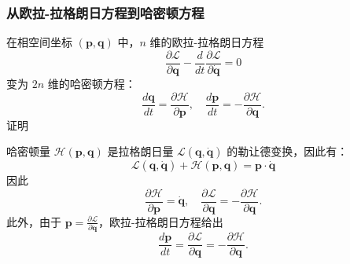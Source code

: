 \subsubsection{从欧拉-拉格朗日方程到哈密顿方程 } 
在相空间坐标 \( (\boldsymbol{p}, \boldsymbol{q}) \) 中，\( n \) 维的欧拉-拉格朗日方程
\[
\frac{\partial \mathcal{L}}{\partial \boldsymbol{q}} - \frac{d}{dt} \frac{\partial \mathcal{L}}{\partial \boldsymbol{\dot{q}}} = 0~
\]
变为 \( 2n \) 维的哈密顿方程：
\[
\frac{d \boldsymbol{q}}{dt} = \frac{\partial \mathcal{H}}{\partial \boldsymbol{p}}, \quad \frac{d \boldsymbol{p}}{dt} = -\frac{\partial \mathcal{H}}{\partial \boldsymbol{q}}.~
\]
证明  

哈密顿量 \( \mathcal{H}(\boldsymbol{p}, \boldsymbol{q}) \) 是拉格朗日量 \( \mathcal{L}(\boldsymbol{q}, \boldsymbol{\dot{q}}) \) 的勒让德变换，因此有：
\[
\mathcal{L}(\boldsymbol{q}, \boldsymbol{\dot{q}}) + \mathcal{H}(\boldsymbol{p}, \boldsymbol{q}) = \boldsymbol{p} \cdot \boldsymbol{\dot{q}}~
\]
因此
\[
\frac{\partial \mathcal{H}}{\partial \boldsymbol{p}} = \boldsymbol{\dot{q}}, \quad \frac{\partial \mathcal{L}}{\partial \boldsymbol{q}} = -\frac{\partial \mathcal{H}}{\partial \boldsymbol{q}}.~
\]
此外，由于 \( \boldsymbol{p} = \frac{\partial \mathcal{L}}{\partial \boldsymbol{\dot{q}}} \)，欧拉-拉格朗日方程给出
\[
\frac{d \boldsymbol{p}}{dt} = \frac{\partial \mathcal{L}}{\partial \boldsymbol{q}} = -\frac{\partial \mathcal{H}}{\partial \boldsymbol{q}}.~
\]